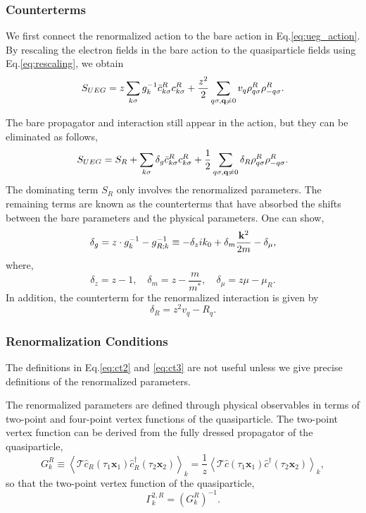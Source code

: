 \documentclass[reprint,amsmath,amssymb,aps,prb]{revtex4-1}
\begin{document}
\subsubsection{Counterterms}

We first connect the renormalized action to the bare action in Eq.\eqref{eq:ueg_action}. By rescaling the electron fields in the bare action to the quasiparticle fields using Eq.\eqref{eq:rescaling}, we obtain
\begin{equation}
    S_{UEG} = z\sum_{k \sigma} g_{k}^{-1}\bar{c}^R_{k \sigma} c^R_{k \sigma} + \frac{z^2}{2}\sum_{q\sigma, \mathbf{q} \neq 0}  v_q \rho^R_{q\sigma} \rho^R_{-q\sigma}.
\end{equation}

The bare propagator and interaction still appear in the action, but they can be eliminated as follows,
\begin{equation}
    \label{eq:renorm_action}
    S_{UEG} = S_R + \sum_{k \sigma} \delta_g \bar{c}^R_{k \sigma} c^R_{k \sigma} + \frac{1}{2}\sum_{q\sigma, \mathbf{q} \neq 0}  \delta_R \rho^R_{q\sigma} \rho^R_{-q\sigma}.
\end{equation}
The dominating term $S_R$ only involves the renormalized parameters. The remaining terms are known as the counterterms that have absorbed the shifts between the bare parameters and the physical parameters. One can show,
\begin{equation}
    \label{eq:ct1}
    \delta_g=z\cdot g_k^{-1}-g_{R; k}^{-1} \equiv -\delta_z ik_0+\delta_m \frac{\mathbf{k}^2}{2m} -\delta_\mu,
\end{equation}
where,
\begin{equation}
    \label{eq:ct2}
    \delta_z=z-1, \quad \delta_m=z-\frac{m}{m^*},\quad  \delta_\mu=z\mu-\mu_R.
\end{equation}
In addition, the counterterm for the renormalized interaction is given by
\begin{equation}
    \label{eq:ct3}
    \delta_R = z^2 v_q - R_q.
\end{equation}

\subsubsection{Renormalization Conditions}

The definitions in Eq.\eqref{eq:ct2} and \eqref{eq:ct3} are not useful unless we give precise definitions of the renormalized parameters.

The renormalized parameters are defined through physical observables in terms of two-point and four-point vertex functions of the quasiparticle.
The two-point vertex function can be derived from the fully dressed propagator of the quasiparticle,
\begin{equation}
    G^R_k \equiv \left< \mathcal{T} \hat{c}_R(\tau_1 \mathbf{x}_1) \hat{c}_R^{\dag}(\tau_2 \mathbf{x}_2) \right>_k=\frac{1}{z}\left< \mathcal{T} \hat{c}(\tau_1 \mathbf{x}_1) \hat{c}^{\dag}(\tau_2 \mathbf{x}_2) \right>_k,
\end{equation}
so that the two-point vertex function of the quasiparticle,
\begin{equation}
    \Gamma^{2,R}_k = (G^R_k)^{-1}.
\end{equation}
\end{document}
